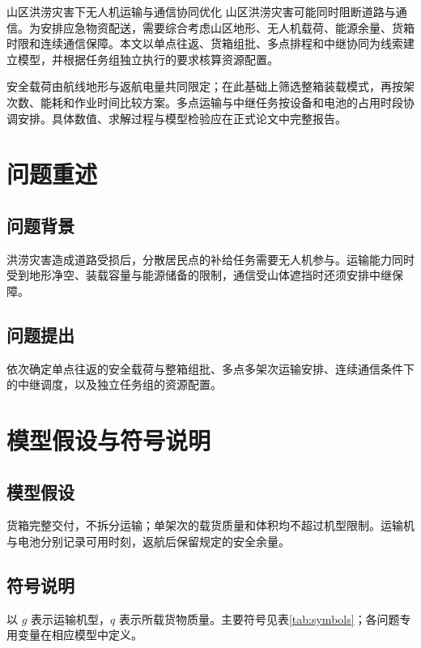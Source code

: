 \documentclass[withoutpreface]{gmcmthesis}
\begin{document}


\begin{paperabstractpage}{山区洪涝灾害下无人机运输与通信协同优化}
山区洪涝灾害可能同时阻断道路与通信。为安排应急物资配送，需要综合考虑山区地形、无人机载荷、能源余量、货箱时限和连续通信保障。本文以单点往返、货箱组批、多点排程和中继协同为线索建立模型，并根据任务组独立执行的要求核算资源配置。

安全载荷由航线地形与返航电量共同限定；在此基础上筛选整箱装载模式，再按架次数、能耗和作业时间比较方案。多点运输与中继任务按设备和电池的占用时段协调安排。具体数值、求解过程与模型检验应在正式论文中完整报告。

\end{paperabstractpage}

\clearpage
\tableofcontents
\clearpage

\Needspace{94pt}
\section{问题重述}
\subsection{问题背景}
洪涝灾害造成道路受损后，分散居民点的补给任务需要无人机参与。运输能力同时受到地形净空、装载容量与能源储备的限制，通信受山体遮挡时还须安排中继保障。
\subsection{问题提出}
依次确定单点往返的安全载荷与整箱组批、多点多架次运输安排、连续通信条件下的中继调度，以及独立任务组的资源配置。

\Needspace{94pt}
\section{模型假设与符号说明}
\subsection{模型假设}
货箱完整交付，不拆分运输；单架次的载货质量和体积均不超过机型限制。运输机与电池分别记录可用时刻，返航后保留规定的安全余量。
\subsection{符号说明}
以 $g$ 表示运输机型，$q$ 表示所载货物质量。主要符号见表\ref{tab:symbols}；各问题专用变量在相应模型中定义。
\end{document}
